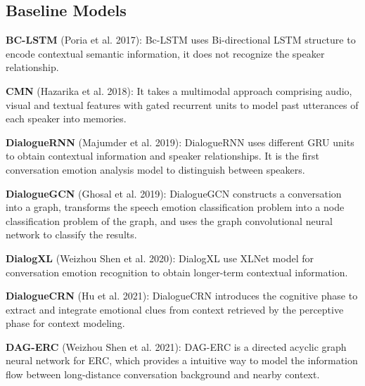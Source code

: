 \documentclass[11pt]{article}
\begin{document}
\subsection{Baseline Models}
\noindent\textbf{BC-LSTM} (Poria et al. 2017): Bc-LSTM uses Bi-directional LSTM structure to encode contextual semantic information, it does not recognize the speaker relationship.

\noindent\textbf{CMN} (Hazarika et al. 2018): It takes a multimodal approach comprising audio, visual and textual features with gated recurrent units to model past utterances of each speaker into memories.

\noindent\textbf{DialogueRNN} (Majumder et al. 2019): DialogueRNN uses different GRU units to obtain contextual information and speaker relationships. It is the first conversation emotion analysis model to distinguish between speakers.

\noindent\textbf{DialogueGCN} (Ghosal et al. 2019): DialogueGCN constructs a conversation into a graph, transforms the speech emotion classification problem into a node classification problem of the graph, and uses the graph convolutional neural network to classify the results.

\noindent\textbf{DialogXL} (Weizhou Shen et al. 2020): DialogXL use XLNet model for conversation emotion recognition to obtain longer-term contextual information.

\noindent\textbf{DialogueCRN} (Hu et al. 2021): DialogueCRN introduces the cognitive phase to extract and integrate emotional clues from context retrieved by the perceptive phase for context modeling.

\noindent\textbf{DAG-ERC} (Weizhou Shen et al. 2021): DAG-ERC  is a directed acyclic graph neural network for ERC, which provides a intuitive way to model the information flow between long-distance conversation background and nearby context.
\end{document}
